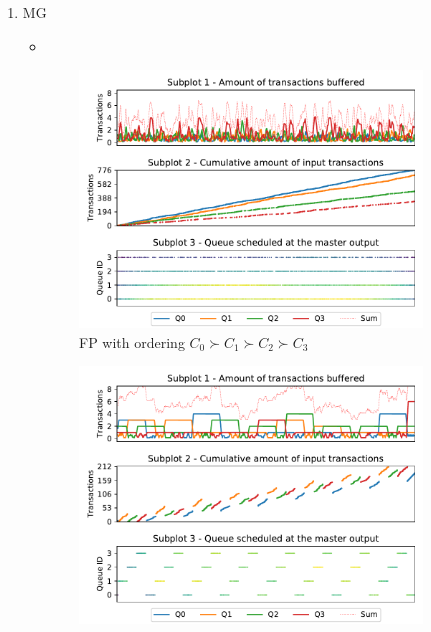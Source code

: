     
    \begin{enumerate}
      \item MG
        \begin{itemize}
          \item 
        \end{itemize}
    \end{enumerate}    
    \begin{figure}[!ht]
      \centering
      \begin{subfigure}{0.5\textwidth}
        \centering
        \includegraphics[scale=0.55]{images/SchIM_FP_buffering.pdf}
        \caption{FP with ordering $C_{0} \succ C_{1} \succ C_{2} \succ C_{3}$}
        \label{fig:schim_behaviour_fp}
      \end{subfigure}
      \vfill
      \begin{subfigure}{0.5\textwidth}
        \centering
        \includegraphics[scale=0.55]{images/SchIM_TDMA_buffering.pdf}

\end{subfigure}
\end{figure}
